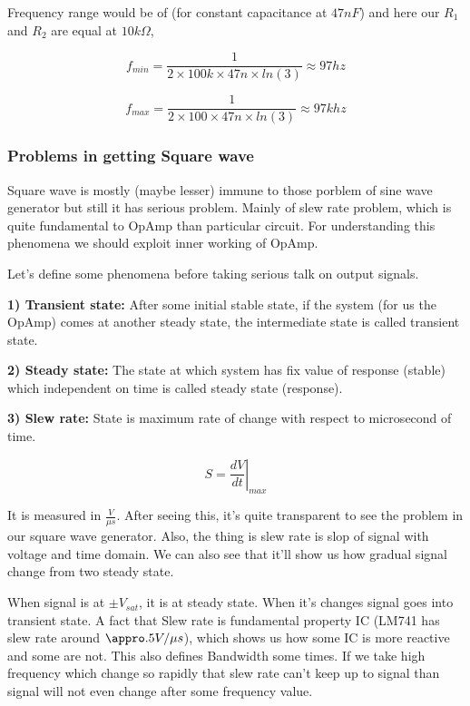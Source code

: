\documentclass[14pt,a4paper]{extarticle}
\begin{document}
Frequency range would be of (for constant capacitance at \(47nF\)) and here our \(R_1\) and \(R_2\) are equal at \(10k\Omega\),

\begin{equation*}
\label{eq:org083c053}
  f_{min} =\frac{1}{2\times 100k\times 47n \times ln(3)} \approx 97 hz
\end{equation*}

\begin{equation*}
\label{eq:org5d633c6}
  f_{max} =\frac{1}{2\times 100 \times 47n \times ln(3)} \approx 97 khz
\end{equation*}


\subsubsection{Problems in getting Square wave}
\label{sec:org917c9f3}

Square wave is mostly (maybe lesser) immune to those porblem of sine wave generator but still it has serious problem. Mainly of slew rate problem, which is quite fundamental to OpAmp than particular circuit. For understanding this phenomena  we should exploit inner working of OpAmp. 

Let's define some phenomena before taking serious talk on output signals.


\textbf{\textbf{1) Transient state:}} After some initial stable state, if the system (for us the OpAmp) comes at another steady state, the intermediate state is called transient state.

\textbf{\textbf{2) Steady state:}} The state at which system has fix value of response (stable) which independent on time is called steady state (response).

\textbf{\textbf{3) Slew rate:}} State is maximum rate of change with respect to microsecond of time. 

$$ S = \left.\frac{dV}{dt}\right|_{max}$$

It is measured in \(\frac{V}{\mu s}\). After seeing this, it's quite transparent to see the problem in our square wave generator. Also, the thing is slew rate is slop of signal with voltage and time domain. We can also see that it'll show us how gradual signal change from two steady state.


When signal is at \(\pm V_{sat}\), it is at steady state. When it's changes signal goes into transient state. A fact that Slew rate is fundamental property IC (LM741 has slew rate around \(\appro .5 V/\mu s\)), which shows us how some IC is more reactive and some are not. This also defines Bandwidth some times. If we take high frequency which change so rapidly that slew rate can't keep up to signal than signal will not even change after some frequency value.
\end{document}
